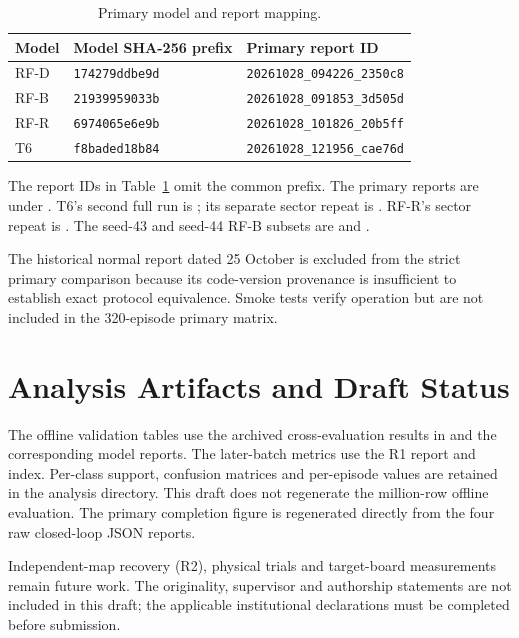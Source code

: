 \begin{table}[htbp]
\centering\small
\caption{Primary model and report mapping.}
\label{tab:sources}
\begin{tabular}{lll}
\toprule Model & Model SHA-256 prefix & Primary report ID \\\midrule
RF-D & \texttt{174279ddbe9d} & \texttt{20261028\_094226\_2350c8} \\
RF-B & \texttt{21939959033b} & \texttt{20261028\_091853\_3d505d} \\
RF-R & \texttt{6974065e6e9b} & \texttt{20261028\_101826\_20b5ff} \\
T6 & \texttt{f8baded18b84} & \texttt{20261028\_121956\_cae76d} \\
\bottomrule
\end{tabular}
\end{table}

The report IDs in Table~\ref{tab:sources} omit the common
 prefix. The primary reports are under
. T6's second full run is
; its separate sector repeat is
. RF-R's sector repeat is
. The seed-43 and seed-44 RF-B subsets
are  and
.

The historical normal report dated 25 October is excluded from the strict
primary comparison because its code-version provenance is insufficient to
establish exact protocol equivalence. Smoke tests verify operation but are
not included in the 320-episode primary matrix.

\section{Analysis Artifacts and Draft Status}
\label{sec:evidence_analysis}
The offline validation tables use the archived cross-evaluation results in
 and the corresponding model reports.
The later-batch metrics use the R1 report and index. Per-class support,
confusion matrices and per-episode values are retained in the analysis
directory. This draft does not regenerate the million-row offline evaluation.
The primary completion figure is regenerated directly from the four raw
closed-loop JSON reports.

Independent-map recovery (R2), physical trials and target-board measurements
remain future work. The originality, supervisor and authorship statements
are not included in this draft; the applicable institutional declarations
must be completed before submission.

\endgroup
